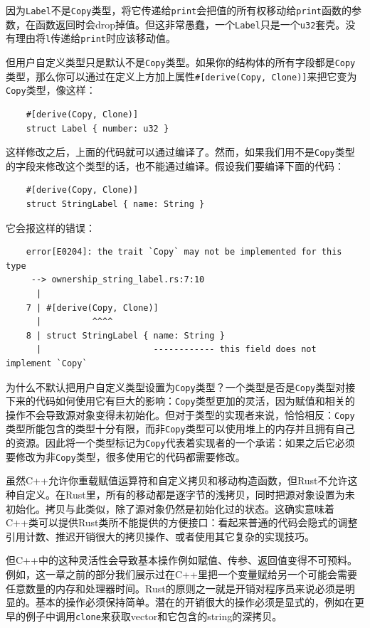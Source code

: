 因为\texttt{Label}不是\texttt{Copy}类型，将它传递给\texttt{print}会把值的所有权移动给\texttt{print}函数的参数，在函数返回时会drop掉值。但这非常愚蠢，一个\texttt{Label}只是一个\texttt{u32}套壳。没有理由将\texttt{l}传递给\texttt{print}时应该移动值。

但用户自定义类型只是默认不是\texttt{Copy}类型。如果你的结构体的所有字段都是\texttt{Copy}类型，那么你可以通过在定义上方加上属性\texttt{\#[derive(Copy, Clone)]}来把它变为\texttt{Copy}类型，像这样：
\begin{verbatim}
    #[derive(Copy, Clone)]
    struct Label { number: u32 }
\end{verbatim}

这样修改之后，上面的代码就可以通过编译了。然而，如果我们用不是\texttt{Copy}类型的字段来修改这个类型的话，也不能通过编译。假设我们要编译下面的代码：
\begin{verbatim}
    #[derive(Copy, Clone)]
    struct StringLabel { name: String }
\end{verbatim}

它会报这样的错误：
\begin{verbatim}
    error[E0204]: the trait `Copy` may not be implemented for this type
     --> ownership_string_label.rs:7:10
      |
    7 | #[derive(Copy, Clone)]
      |          ^^^^
    8 | struct StringLabel { name: String }
      |                      ------------ this field does not implement `Copy`
\end{verbatim}

为什么不默认把用户自定义类型设置为\texttt{Copy}类型？一个类型是否是\texttt{Copy}类型对接下来的代码如何使用它有巨大的影响：\texttt{Copy}类型更加的灵活，因为赋值和相关的操作不会导致源对象变得未初始化。但对于类型的实现者来说，恰恰相反：\texttt{Copy}类型所能包含的类型十分有限，而非\texttt{Copy}类型可以使用堆上的内存并且拥有自己的资源。因此将一个类型标记为\texttt{Copy}代表着实现者的一个承诺：如果之后它必须要修改为非\texttt{Copy}类型，很多使用它的代码都需要修改。

虽然C++允许你重载赋值运算符和自定义拷贝和移动构造函数，但Rust不允许这种自定义。在Rust里，所有的移动都是逐字节的浅拷贝，同时把源对象设置为未初始化。拷贝与此类似，除了源对象仍然是初始化过的状态。这确实意味着C++类可以提供Rust类所不能提供的方便接口：看起来普通的代码会隐式的调整引用计数、推迟开销很大的拷贝操作、或者使用其它复杂的实现技巧。

但C++中的这种灵活性会导致基本操作例如赋值、传参、返回值变得不可预料。例如，这一章之前的部分我们展示过在C++里把一个变量赋给另一个可能会需要任意数量的内存和处理器时间。Rust的原则之一就是开销对程序员来说必须是明显的。基本的操作必须保持简单。潜在的开销很大的操作必须是显式的，例如在更早的例子中调用\texttt{clone}来获取vector和它包含的string的深拷贝。

